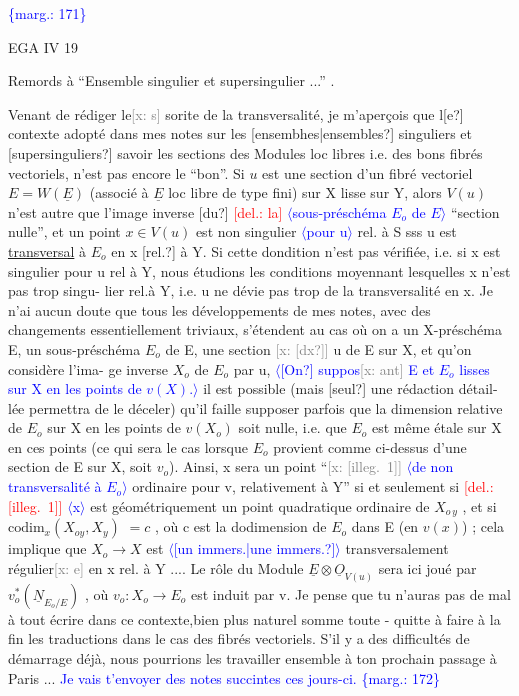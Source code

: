 \documentclass[11pt]{article}
\newcommand{\scanpage}[1]{\par\bigskip\noindent{\small\sffamily[scan #1]}\par}
\newcommand{\mspage}[1]{{\small\sffamily[p.\,#1]}}
\newcommand{\hand}[1]{\textcolor{blue}{#1}}
\newcommand{\inserted}[2][]{\textcolor{blue}{$\langle$#2$\rangle$}}
\newcommand{\margin}[1]{\textcolor{blue}{\{\textsf{marg.:} #1\}}}
\newcommand{\deleted}[1]{\textcolor{red}{[\textsf{del.:} #1]}}
\newcommand{\xout}[1]{\textcolor{gray}{[\textsf{x:} #1]}}
\newcommand{\uline}[1]{\underline{#1}}
\newcommand{\unsure}[1]{[#1?]}
\newcommand{\illegible}[1]{[\textsf{illeg.\ #1}]}
\begin{document}
\margin{171}

\clearpage
\scanpage{25/172}
\mspage{7}

EGA IV 19

Remords à ``Ensemble singulier et supersingulier ...'' .

Venant de rédiger le\xout{s} sorite de la transversalité, je m'aperçois que l\unsure{e}
contexte adopté dans mes notes sur les \unsure{ensembhes|ensembles} singuliers et \unsure{supersinguliers}
savoir les sections des Modules loc libres i.e. des bons fibrés vectoriels,
n'est pas encore le ``bon''. Si $u$ est une section d'un fibré vectoriel
$E = W(\underline{E})$ (associé à $\underline{E}$ loc libre de type fini) sur X lisse sur Y, alors $V(u)$
n'est autre que l'image inverse \unsure{du} \deleted{la} \inserted{sous-préschéma $E_{o}$ de $E$} ``section nulle'', et un point $x\in V(u)$
est non singulier \inserted{pour u} rel. à S sss u est \uline{transversal} à $E_{o}$ en x \unsure{rel.} à Y.
Si cette dondition n'est pas vérifiée, i.e. si x est singulier pour u rel à
Y, nous étudions les conditions moyennant lesquelles x n'est pas trop singu-%
lier rel.à Y, i.e. u ne dévie pas trop de la transversalité en x. Je n'ai
aucun doute que tous les développements de mes notes, avec des changements
essentiellement triviaux, s'étendent au cas où on a un X-préschéma E, un
sous-préschéma $E_{o}$ de E, une section \xout{\unsure{dx}} u de E sur X, et qu'on considère l'ima-%
ge inverse $X_{o}$ de $E_{o}$ par u, \inserted[typed]{\unsure{On} suppos\xout{ant} E et $E_{o}$ lisses sur X en les points de $v(X)$.} il est possible (mais \unsure{seul} une rédaction détail-%
lée permettra de le déceler) qu'il faille supposer parfois que la dimension
relative de $E_{o}$ sur X en les points de $v(X_{o})$ soit nulle, i.e. que $E_{o}$ est
même étale sur X en ces points (ce qui sera le cas lorsque $E_{o}$ provient comme
ci-dessus d'une section de E sur X, soit $v_{o}$). Ainsi, x sera un point
``\xout{\illegible{1}} \inserted{de non transversalité à $E_{o}$} ordinaire pour v, relativement à Y'' si et seulement si \deleted{\illegible{1}} \inserted{x} est
géométriquement un point quadratique ordinaire de $X_{o\,y}$ , et si $\mathrm{codim}_{x}(X_{oy},X_{y})$
$= c$ , où c est la dodimension de $E_{o}$ dans E (en $v(x)$) ; cela implique que
$X_{o}\longrightarrow X$ est \inserted{\unsure{un immers.|une immers.}} transversalement régulier\xout{e} en x rel. à Y .... Le rôle du Module
$\underline{E}\otimes\underline{O}_{V(u)}$ sera ici joué par $v_{o}^{*}(\underline{N}_{E_{o}/E})$ , où $v_{o}:X_{o}\longrightarrow E_{o}$ est induit par v. Je
pense que tu n'auras pas de mal à tout écrire dans ce contexte,bien plus
naturel somme toute - quitte à faire à la fin les traductions dans le cas
des fibrés vectoriels. S'il y a des difficultés de démarrage déjà, nous
pourrions les travailler ensemble à ton prochain passage à Paris ... \hand{Je vais t'envoyer des notes succintes ces jours-ci.}
\margin{172}
\end{document}
